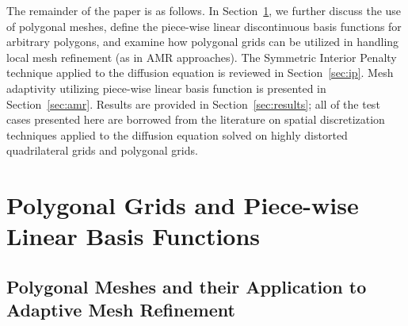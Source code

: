 \documentclass[preprint,10pt]{elsarticle}
\newcommand{\sct}[1]{Section~\ref{#1}}                   %
\begin{document}

The remainder of the paper is as follows. In \sct{sec:poly}, we further discuss
the use of polygonal meshes, define the piece-wise linear discontinuous 
basis functions for arbitrary polygons, and examine how polygonal grids
can be utilized in handling local mesh refinement (as in AMR 
approaches). The Symmetric Interior Penalty technique applied to the diffusion 
equation is reviewed in \sct{sec:ip}.
Mesh adaptivity utilizing piece-wise linear basis function is presented in 
\sct{sec:amr}. Results are provided in \sct{sec:results}; all of the test cases presented here 
are borrowed from the literature on spatial discretization techniques applied to 
the diffusion equation solved on highly distorted quadrilateral grids and polygonal grids.

\section{Polygonal Grids and Piece-wise Linear Basis Functions} \label{sec:poly}
\subsection{Polygonal Meshes and their Application to Adaptive Mesh Refinement}
\end{document}
